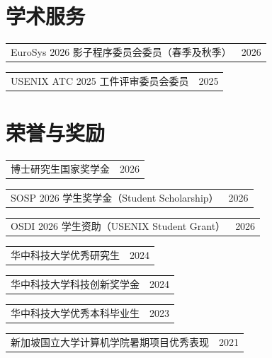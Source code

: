 \documentclass[a4paper,11pt]{article}
\makeatletter
\newcommand{\datedentry}[2]{%
  \begin{tabular*}{\textwidth}{@{\extracolsep{\fill}}lr}
    #1 & #2
  \end{tabular*}%
}
\makeatother
\begin{document}
\section{学术服务}

\datedentry
  {EuroSys 2026 影子程序委员会委员（春季及秋季）}
  {2026}
\vspace{0.24em}
\datedentry
  {USENIX ATC 2025 工件评审委员会委员}
  {2025}

\section{荣誉与奖励}

\datedentry
  {博士研究生国家奖学金}
  {2026}
\vspace{0.20em}
\datedentry
  {SOSP 2026 学生奖学金（Student Scholarship）}
  {2026}
\vspace{0.20em}
\datedentry
  {OSDI 2026 学生资助（USENIX Student Grant）}
  {2026}
\vspace{0.20em}
\datedentry
  {华中科技大学优秀研究生}
  {2024}
\vspace{0.20em}
\datedentry
  {华中科技大学科技创新奖学金}
  {2024}
\vspace{0.20em}
\datedentry
  {华中科技大学优秀本科毕业生}
  {2023}
\vspace{0.20em}
\datedentry
  {新加坡国立大学计算机学院暑期项目优秀表现}
  {2021}
\end{document}
